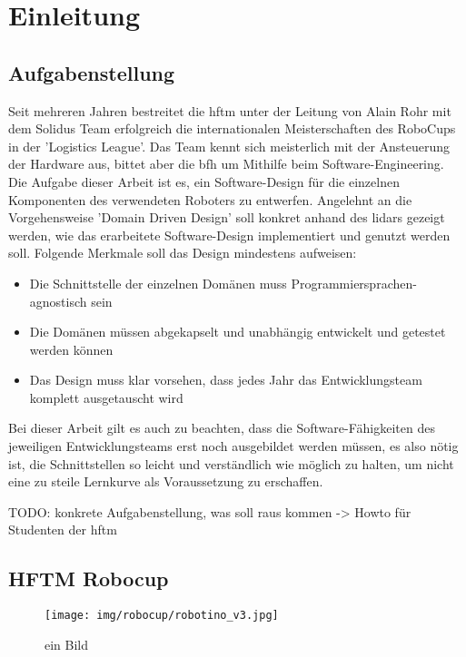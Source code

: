 \chapter{Einleitung}
\section{Aufgabenstellung}
Seit mehreren Jahren bestreitet die \acrshort{hftm} unter der Leitung von Alain Rohr mit dem Solidus Team erfolgreich die internationalen Meisterschaften des RoboCups in der 'Logistics League'.
Das Team kennt sich meisterlich mit der Ansteuerung der Hardware aus, bittet aber die \acrshort{bfh} um Mithilfe beim Software-Engineering.
Die Aufgabe dieser Arbeit ist es, ein Software-Design für die einzelnen Komponenten des verwendeten Roboters zu entwerfen. Angelehnt an die Vorgehensweise 'Domain Driven Design' soll konkret anhand des \acrshort{lidar}s gezeigt werden, wie das erarbeitete Software-Design implementiert und genutzt werden soll. Folgende Merkmale soll das Design mindestens aufweisen:

\begin{itemize}
	\item
	Die Schnittstelle der einzelnen Domänen muss Programmiersprachen-agnostisch sein
	
	\item
	Die Domänen müssen abgekapselt und unabhängig entwickelt und getestet werden können
	
	\item
	Das Design muss klar vorsehen, dass jedes Jahr das Entwicklungsteam komplett ausgetauscht wird
\end{itemize}
Bei dieser Arbeit gilt es auch zu beachten, dass die Software-Fähigkeiten des jeweiligen Entwicklungsteams erst noch ausgebildet werden müssen, es also nötig ist, die Schnittstellen so leicht und verständlich wie möglich zu halten, um nicht eine zu steile Lernkurve als Voraussetzung zu erschaffen.


\bigskip
TODO:
konkrete Aufgabenstellung, was soll raus kommen -> Howto für Studenten der \acrshort{hftm}

\section{HFTM Robocup}
\begin{figure}[htbp]
	\centering
	\texttt{[image: img/robocup/robotino\_v3.jpg]}
	\caption{ein Bild\cite{robotino}}  
\end{figure}

